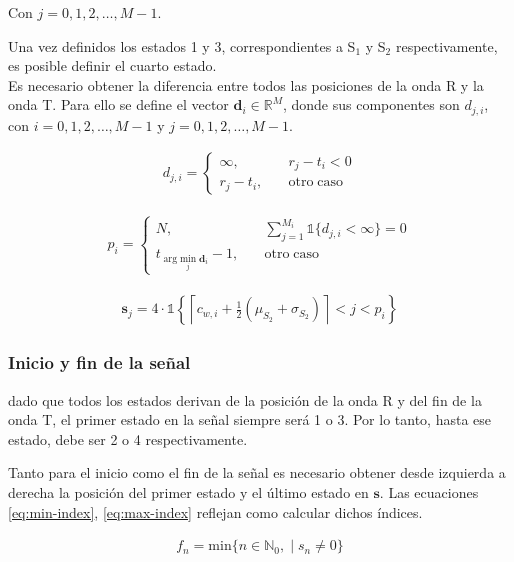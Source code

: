 \indent Con $j=0,1,2,\dots,M-1$. \bigskip

\indent Una vez definidos los estados 1 y 3, correspondientes a S$_1$ y S$_2$ respectivamente, es posible definir el
cuarto estado. \\
\indent Es necesario obtener la diferencia entre todos las posiciones de la onda R y la onda T. Para ello se define
el vector $\mathbf{d}_i \in \mathbb{R}^M$, donde sus componentes son $d_{j,i}$, con $i = 0,1,2,\dots,M-1$ y $j = 0,
1,2,\dots,M-1$.

\begin{align}
  d_{j,i} = \begin{cases}
    \infty, \qquad &r_j - t_i < 0 \\
    r_j - t_i, \quad &\mathrm{otro \; caso}
  \end{cases}
\end{align}


\begin{align}
  p_i = \begin{cases}
    N, \quad &\sum_{j=1}^{M_i} \mathds{1}\big\{d_{j,i} < \infty\big\} =  0  \\
    t_{\arg \underset{j}{\mathrm{min}} \; \mathbf{d}_i} -1, \quad  & \mathrm{otro \; caso}
  \end{cases}
\end{align}

\begin{align}
  \mathbf{s}_j = 4 \cdot \mathds{1}\left\{\left\lceil c_{w,i} + \frac{1}{2}(\mu_{S_2} + \sigma_{S_2}) \right\rceil <
  j < p_i  \right\}
\end{align}

\subsubsection*{Inicio y fin de la señal}

\indent dado que todos los estados derivan de la posición de la onda R y del fin de la onda T, el primer estado en
la señal siempre será 1 o 3. Por lo tanto, hasta ese estado, debe ser 2 o 4 respectivamente.

\indent Tanto para el inicio como el fin de la señal es necesario obtener desde izquierda a derecha la posición del
primer estado y el último estado en $\mathbf{s}$. Las ecuaciones \ref{eq:min-index}, \ref{eq:max-index} reflejan
como calcular dichos índices.

\begin{align} \label{eq:min-index}
  f_n = \mathrm{min}\big\{ n \in \mathbb{N}_0, \; | \; s_n \neq 0  \big\}
\end{align}

